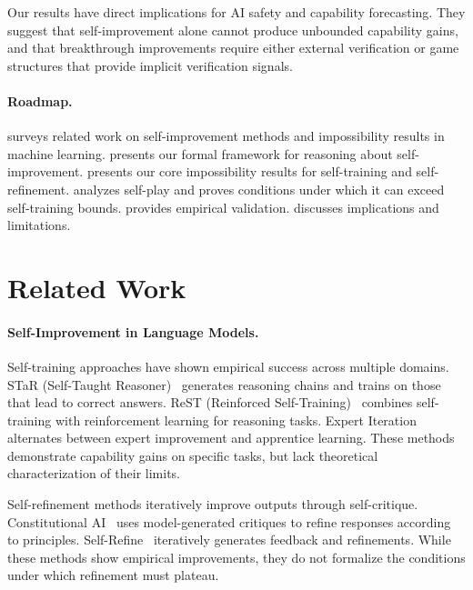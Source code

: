 \documentclass{article}
\theoremstyle{definition}
\theoremstyle{remark}
\begin{document}
Our results have direct implications for AI safety and capability forecasting. They suggest that self-improvement alone cannot produce unbounded capability gains, and that breakthrough improvements require either external verification or game structures that provide implicit verification signals.

\paragraph{Roadmap.}  surveys related work on self-improvement methods and impossibility results in machine learning.  presents our formal framework for reasoning about self-improvement.  presents our core impossibility results for self-training and self-refinement.  analyzes self-play and proves conditions under which it can exceed self-training bounds.  provides empirical validation.  discusses implications and limitations.

\section{Related Work}
\label{sec:related}

\paragraph{Self-Improvement in Language Models.}
Self-training approaches have shown empirical success across multiple domains. STaR (Self-Taught Reasoner)~\cite{zelikman2022star} generates reasoning chains and trains on those that lead to correct answers. ReST (Reinforced Self-Training)~\cite{gulcehre2023reinforced} combines self-training with reinforcement learning for reasoning tasks. Expert Iteration~\cite{anthony2017thinking} alternates between expert improvement and apprentice learning. These methods demonstrate capability gains on specific tasks, but lack theoretical characterization of their limits.

Self-refinement methods iteratively improve outputs through self-critique. Constitutional AI~\cite{bai2022constitutional} uses model-generated critiques to refine responses according to principles. Self-Refine~\cite{madaan2023selfrefine} iteratively generates feedback and refinements. While these methods show empirical improvements, they do not formalize the conditions under which refinement must plateau.
\end{document}
